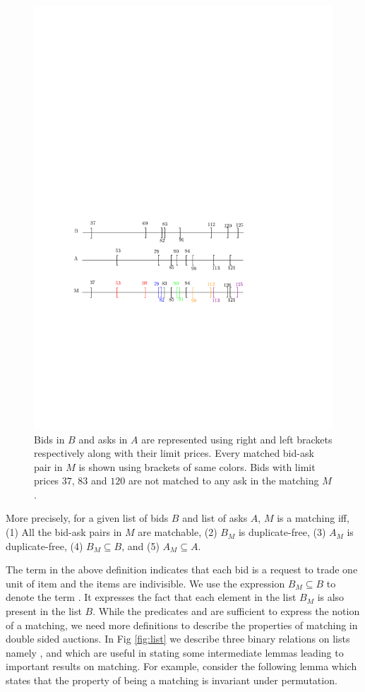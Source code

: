 \documentclass[a4paper,UKenglish,cleveref, autoref]{lipics-v2019}
\begin{document}
\begin{figure}[h!]
\centering
\includegraphics[width=.6\textwidth]{brack_matching.pdf}
\caption{ Bids in $B$ and asks in $A$ are represented using right and left brackets respectively along with their limit prices. Every matched bid-ask pair in $M$ is shown using  brackets of same colors. Bids with limit prices $37$, $83$ and $120$ are not matched to any ask in the matching $M$.}
\label{fig:matching}
\end{figure}

More precisely, for a given list of bids $B$ and list of asks $A$, $M$ is a matching iff, (1) All the bid-ask pairs in $M$ are matchable, (2) $B_M$ is duplicate-free, (3) $A_M$ is duplicate-free, (4) $B_M \subseteq B$, and (5) $A_M \subseteq A$.

\begin{definition}
\end{definition}
The term \emph{} in  the above definition indicates that each bid is a request to trade one unit of item and the items are indivisible.  We use the expression $B_M \subseteq B$  to denote the term .  It expresses the fact that each element in the list $B_M$ is also present in the list $B$. While the predicates  and    are sufficient to express the notion of a matching, we need more definitions to describe the properties of matching in double sided auctions.  In Fig \ref{fig:list} we describe three binary relations on lists namely ,  and  which are useful in stating some intermediate lemmas leading to important results on matching. For example, consider the following lemma which states that the property of being a matching is invariant under permutation. 
\end{document}
